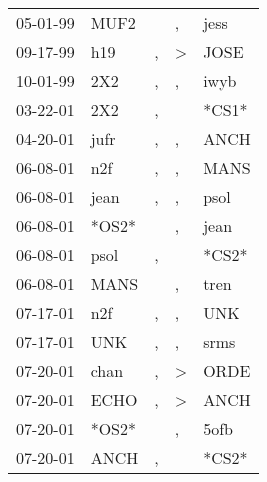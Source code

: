 \begin{supertabular}{p{0.07\textwidth}p{0.06\textwidth}p{0.02\textwidth}p{0.02\textwidth}p{0.06\textwidth}}
 05-01-99\textsuperscript{} &  MUF2\textsuperscript{} &               &             , &  jess\textsuperscript{} \\
 09-17-99\textsuperscript{} &   h19\textsuperscript{} &             , &  \textgreater &  JOSE\textsuperscript{} \\
 10-01-99\textsuperscript{} &   2X2\textsuperscript{} &             , &             , &  iwyb\textsuperscript{} \\
 03-22-01\textsuperscript{} &   2X2\textsuperscript{} &             , &               &                   *CS1* \\
 04-20-01\textsuperscript{} &  jufr\textsuperscript{} &             , &             , &  ANCH\textsuperscript{} \\
 06-08-01\textsuperscript{} &   n2f\textsuperscript{} &             , &             , &  MANS\textsuperscript{} \\
 06-08-01\textsuperscript{} &  jean\textsuperscript{} &             , &             , &  psol\textsuperscript{} \\
 06-08-01\textsuperscript{} &                   *OS2* &               &             , &  jean\textsuperscript{} \\
 06-08-01\textsuperscript{} &  psol\textsuperscript{} &             , &               &                   *CS2* \\
 06-08-01\textsuperscript{} &  MANS\textsuperscript{} &               &             , &  tren\textsuperscript{} \\
 07-17-01\textsuperscript{} &   n2f\textsuperscript{} &             , &             , &   UNK\textsuperscript{} \\
 07-17-01\textsuperscript{} &   UNK\textsuperscript{} &             , &             , &  srms\textsuperscript{} \\
 07-20-01\textsuperscript{} &  chan\textsuperscript{} &             , &  \textgreater &  ORDE\textsuperscript{} \\
 07-20-01\textsuperscript{} &  ECHO\textsuperscript{} &             , &  \textgreater &  ANCH\textsuperscript{} \\
 07-20-01\textsuperscript{} &                   *OS2* &               &             , &  5ofb\textsuperscript{} \\
 07-20-01\textsuperscript{} &  ANCH\textsuperscript{} &             , &               &                   *CS2* \\

\end{supertabular}
